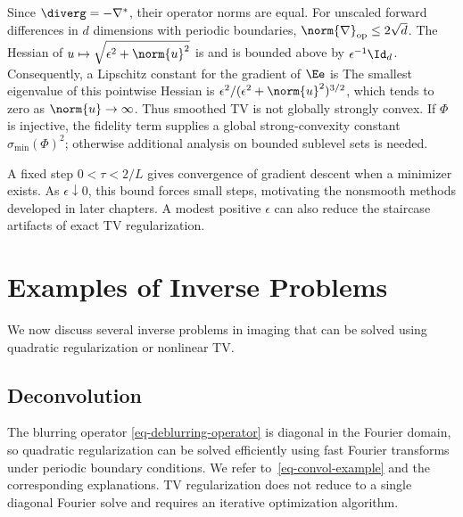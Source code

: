 Since $\diverg=-\nabla^*$, their operator norms are equal. For unscaled forward differences in $d$ dimensions with periodic boundaries, $\norm{\nabla}_{\mathrm{op}}\leq2\sqrt d$. The Hessian of $u\mapsto\sqrt{\epsilon^2+\norm{u}^2}$ is
and is bounded above by $\epsilon^{-1}\Id_d$. Consequently, a Lipschitz constant for the gradient of $\Ee$ is
The smallest eigenvalue of this pointwise Hessian is $\epsilon^2/(\epsilon^2+\norm{u}^2)^{3/2}$, which tends to zero as $\norm{u}\to\infty$. Thus smoothed TV is not globally strongly convex. If $\Phi$ is injective, the fidelity term supplies a global strong-convexity constant $\sigma_{\min}(\Phi)^2$; otherwise additional analysis on bounded sublevel sets is needed.

A fixed step $0<\tau<2/L$ gives convergence of gradient descent when a minimizer exists. As $\epsilon\downarrow0$, this bound forces small steps, motivating the nonsmooth methods developed in later chapters. A modest positive $\epsilon$ can also reduce the staircase artifacts of exact TV regularization.

\section{Examples of Inverse Problems}

We now discuss several inverse problems in imaging that can be solved using quadratic regularization or nonlinear TV.

\subsection{Deconvolution}
\label{subsec-deconv}

The blurring operator \eqref{eq-deblurring-operator} is diagonal in the Fourier domain, so quadratic regularization can be solved efficiently using fast Fourier transforms under periodic boundary conditions. We refer to~\eqref{eq-convol-example} and the corresponding explanations. TV regularization does not reduce to a single diagonal Fourier solve and requires an iterative optimization algorithm.


